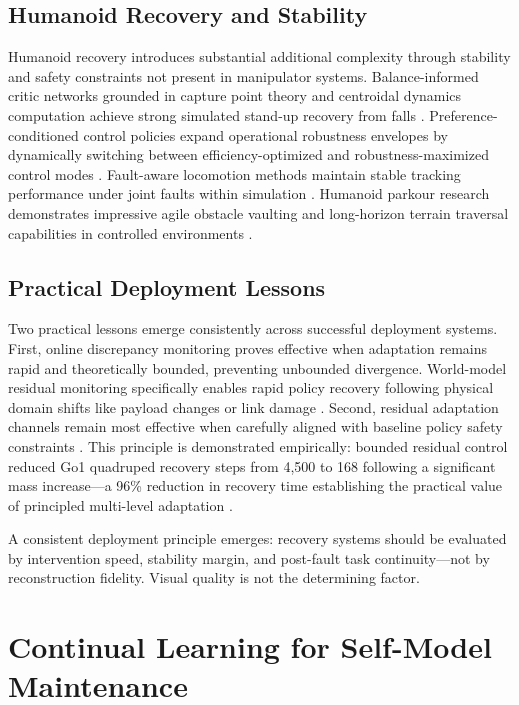 \documentclass[12pt,a4paper,oneside]{report}
\begin{document}
\subsection{Humanoid Recovery and Stability}

Humanoid recovery introduces substantial additional complexity through stability and safety constraints not present in manipulator systems. Balance-informed critic networks grounded in capture point theory and centroidal dynamics computation achieve strong simulated stand-up recovery from falls \cite{poddar2026embedding}. Preference-conditioned control policies expand operational robustness envelopes by dynamically switching between efficiency-optimized and robustness-maximized control modes \cite{li2026pchc}. Fault-aware locomotion methods maintain stable tracking performance under joint faults within simulation \cite{lee2026tolebi}. Humanoid parkour research demonstrates impressive agile obstacle vaulting and long-horizon terrain traversal capabilities in controlled environments \cite{wu2026parkour}.

\subsection{Practical Deployment Lessons}

Two practical lessons emerge consistently across successful deployment systems. First, online discrepancy monitoring proves effective when adaptation remains rapid and theoretically bounded, preventing unbounded divergence. World-model residual monitoring specifically enables rapid policy recovery following physical domain shifts like payload changes or link damage \cite{domberg2026selfadapting}. Second, residual adaptation channels remain most effective when carefully aligned with baseline policy safety constraints \cite{jayasinghe2026residual}. This principle is demonstrated empirically: bounded residual control reduced Go1 quadruped recovery steps from 4,500 to 168 following a significant mass increase---a 96\% reduction in recovery time establishing the practical value of principled multi-level adaptation \cite{jayasinghe2026residual}.

A consistent deployment principle emerges: recovery systems should be evaluated by intervention speed, stability margin, and post-fault task continuity---not by reconstruction fidelity. Visual quality is not the determining factor.

\section{Continual Learning for Self-Model Maintenance}
\end{document}
